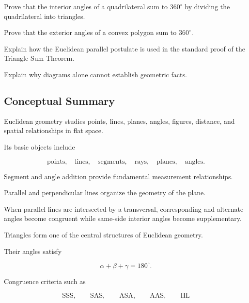 \begin{exercise}[3]
Prove that the interior angles of a quadrilateral sum to \(360^\circ\) by
dividing the quadrilateral into triangles.
\end{exercise}

\begin{exercise}[3]
Prove that the exterior angles of a convex polygon sum to \(360^\circ\).
\end{exercise}

\begin{exercise}[3]
Explain how the Euclidean parallel postulate is used in the standard proof
of the Triangle Sum Theorem.
\end{exercise}

\begin{exercise}[3]
Explain why diagrams alone cannot establish geometric facts.
\end{exercise}

\subsection{Conceptual Summary}
\label{subsec:euclidean-geometry-summary}

Euclidean geometry studies points, lines, planes, angles, figures, distance,
and spatial relationships in flat space.

Its basic objects include

\[
\boxed{
\text{points},\quad
\text{lines},\quad
\text{segments},\quad
\text{rays},\quad
\text{planes},\quad
\text{angles}.
}
\]

Segment and angle addition provide fundamental measurement relationships.

Parallel and perpendicular lines organize the geometry of the plane.

When parallel lines are intersected by a transversal, corresponding and
alternate angles become congruent while same-side interior angles become
supplementary.

Triangles form one of the central structures of Euclidean geometry.

Their angles satisfy

\[ \boxed{\alpha+\beta+\gamma=180^\circ.} \]

Congruence criteria such as

\[
\mathrm{SSS},\qquad
\mathrm{SAS},\qquad
\mathrm{ASA},\qquad
\mathrm{AAS},\qquad
\mathrm{HL}
\]

